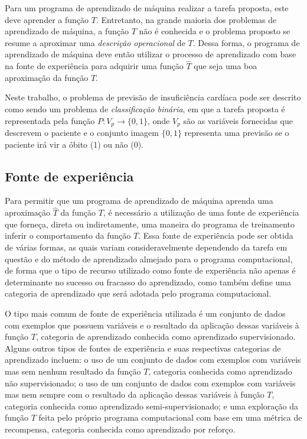 Para um programa de aprendizado de máquina realizar a tarefa proposta, este deve aprender a função $T$. Entretanto, na grande maioria dos problemas de aprendizado de máquina, a função $T$ não é conhecida e o problema proposto se resume a aproximar uma \textit{descrição operacional} de $T$\cite[p.8]{machine_learning}. Dessa forma, o programa de aprendizado de máquina deve então utilizar o processo de aprendizado com base na fonte de experiência para adquirir uma função $\hat{T}$ que seja uma boa aproximação da função $T$.

Neste trabalho, o problema de previsão de insuficiência cardíaca pode ser descrito como sendo um problema de \textit{classificação binária}, em que a tarefa proposta é representada pela função $P : V_{p} \rightarrow \{0, 1\}$, onde $V_{p}$ são as variáveis fornecidas que descrevem o paciente e o conjunto imagem $\{0, 1\}$ representa uma previsão se o paciente irá vir a óbito (1) ou não (0).

\subsection{Fonte de experiência}

Para permitir que um programa de aprendizado de máquina aprenda uma aproximação $\hat{T}$ da função $T$, é necessário a utilização de uma fonte de experiência que forneça, direta ou indiretamente, uma maneira do programa de treinamento inferir o comportamento da função $T$. Essa fonte de experiência pode ser obtida de várias formas, as quais variam consideravelmente dependendo da tarefa em questão e do método de aprendizado almejado para o programa computacional, de forma que o tipo de recurso utilizado como fonte de experiência não apenas é determinante no sucesso ou fracasso do aprendizado, como também define uma categoria de aprendizado que será adotada pelo programa computacional.

O tipo mais comum de fonte de experiência utilizada é um conjunto de dados com exemplos que possuem variáveis e o resultado da aplicação dessas variáveis à função $T$, categoria de aprendizado conhecida como aprendizado supervisionado. Alguns outros tipos de fontes de experiência e suas respectivas categorias de aprendizado incluem: o uso de um conjunto de dados com exemplos com variáveis mas sem nenhum resultado da função $T$, categoria conhecida como aprendizado não supervisionado; o uso de um conjunto de dados com exemplos com variáveis mas nem sempre com o resultado da aplicação dessas variáveis à função $T$, categoria conhecida como aprendizado semi-supervisionado; e uma exploração da função $T$ feita pelo próprio programa computacional com base em uma métrica de recompensa, categoria conhecida como aprendizado por reforço.

